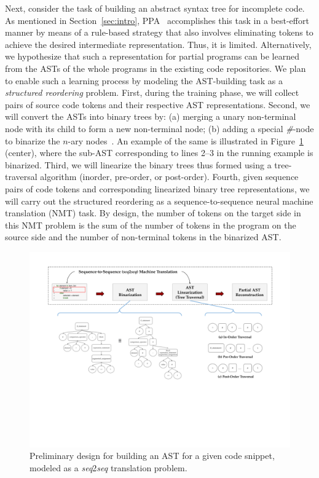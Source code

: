 Next, consider the task of building an abstract syntax tree for incomplete code. As mentioned in Section~\ref{sec:intro}, PPA~\cite{ppa08} accomplishes this task in a best-effort manner by means of a rule-based strategy that also involves eliminating tokens to achieve the desired intermediate representation. Thus, it is limited. Alternatively, we hypothesize that such a representation for partial programs can be learned from the ASTs of the whole programs in the existing code repositories. We plan to enable such a learning process by modeling the AST-building task as a {\em structured reordering} problem. First, during the training phase, we will collect pairs of source code tokens and their respective AST representations. Second, we will convert the ASTs into binary trees by: (a) merging a unary non-terminal node with its child to form a new non-terminal node; (b) adding a special {\em \#}-node to binarize the $n$-ary nodes~\cite{https://doi.org/10.48550/arxiv.2206.11719}. An example of the same is illustrated in Figure~\ref{fig:ast-bt-mapping} (center), where the sub-AST corresponding to lines 2--3 in the running example is binarized. Third, we will linearize the binary trees thus formed using a tree-traversal algorithm (inorder, pre-order, or post-order). Fourth, given sequence pairs of code tokens and corresponding linearized binary tree representations, we will carry out the structured reordering as a sequence-to-sequence neural machine translation (NMT) task. By design, the number of tokens on the target side in this NMT problem is the sum of the number of tokens in the program on the source side and the number of non-terminal tokens in the binarized AST.

\begin{figure}[h]
    \centering
    \includegraphics[width=\textwidth]{figures/seq2seq_2.png}
    \vspace{-135pt}
    \caption{Preliminary design for building an AST for a given code snippet, modeled as a \textit{seq}2\textit{seq} translation problem.}
    \label{fig:ast-bt-mapping}
\end{figure}

